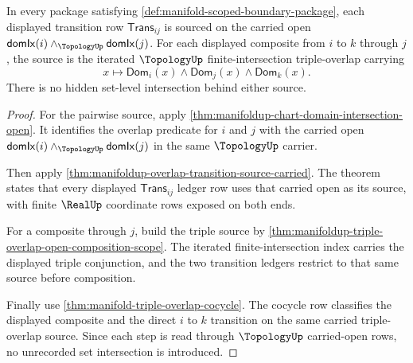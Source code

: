 \begin{theorem}
\label{thm:manifold-scoped-transition-source-determinacy}
In every package satisfying
\autoref{def:manifold-scoped-boundary-package}, each displayed transition row
$\mathsf{Trans}_{ij}$ is sourced on the carried open
$\mathsf{domIx}(i)\wedge_{\TopologyUp}\mathsf{domIx}(j)$. For each displayed
composite from $i$ to $k$ through $j$, the source is the iterated
$\TopologyUp$ finite-intersection triple-overlap carrying
$$
x\longmapsto
\mathsf{Dom}_i(x)\wedge\mathsf{Dom}_j(x)\wedge\mathsf{Dom}_k(x).
$$
There is no hidden set-level intersection behind either source.
\end{theorem}
\begin{proof}
For the pairwise source, apply
\autoref{thm:manifoldup-chart-domain-intersection-open}. It identifies the
overlap predicate for $i$ and $j$ with the carried open
$\mathsf{domIx}(i)\wedge_{\TopologyUp}\mathsf{domIx}(j)$ in the same
$\TopologyUp$ carrier.

Then apply
\autoref{thm:manifoldup-overlap-transition-source-carried}. The theorem states
that every displayed $\mathsf{Trans}_{ij}$ ledger row uses that carried open as
its source, with finite $\RealUp$ coordinate rows exposed on both ends.

For a composite through $j$, build the triple source by
\autoref{thm:manifoldup-triple-overlap-open-composition-scope}. The iterated
finite-intersection index carries the displayed triple conjunction, and the
two transition ledgers restrict to that same source before composition.

Finally use \autoref{thm:manifold-triple-overlap-cocycle}. The cocycle row
classifies the displayed composite and the direct $i$ to $k$ transition on the
same carried triple-overlap source. Since each step is read through
$\TopologyUp$ carried-open rows, no unrecorded set intersection is introduced.
\end{proof}

